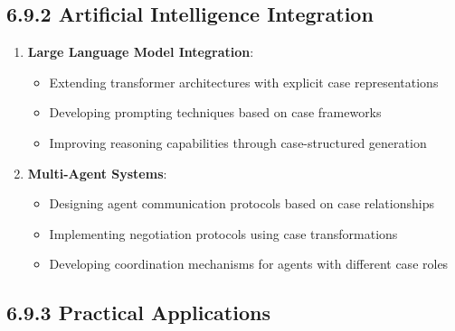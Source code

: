 \documentclass[
  11pt,
  letterpaper,
]{article}
\providecommand{\tightlist}{%
  \setlength{\itemsep}{0pt}\setlength{\parskip}{0pt}}
\begin{document}
\hypertarget{artificial-intelligence-integration}{%
\subsection{6.9.2 Artificial Intelligence
Integration}\label{artificial-intelligence-integration}}

\begin{enumerate}
\def\labelenumi{\arabic{enumi}.}
\tightlist
\item
  \textbf{Large Language Model Integration}:

  \begin{itemize}
  \tightlist
  \item
    Extending transformer architectures with explicit case
    representations
  \item
    Developing prompting techniques based on case frameworks
  \item
    Improving reasoning capabilities through case-structured generation
  \end{itemize}
\item
  \textbf{Multi-Agent Systems}:

  \begin{itemize}
  \tightlist
  \item
    Designing agent communication protocols based on case relationships
  \item
    Implementing negotiation protocols using case transformations
  \item
    Developing coordination mechanisms for agents with different case
    roles
  \end{itemize}
\end{enumerate}

\hypertarget{practical-applications-1}{%
\subsection{6.9.3 Practical
Applications}\label{practical-applications-1}}
\end{document}
